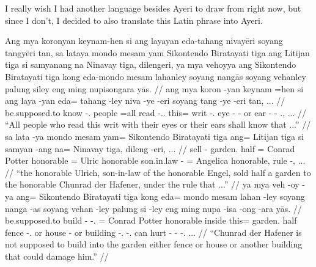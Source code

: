 \documentclass[12pt,paper=a4]{scrartcl}
\begin{document}
	I really wish I had another language besides Ayeri to draw from right 
	now, but since I don't, I decided to also translate this Latin phrase 
	into Ayeri.


\pex
	\glpreamble Ang mya koronyan keynam-hen si ang layayan eda-tahang 
		nivayēri soyang tangyēri tan, sa lataya mondo mesam yam 
		Sikontendo Biratayati tiga ang Litijan tiga si samyanang na 
		Ninavay tiga, dilengeri, ya mya vehoyya ang Sikontendo 
		Biratayati tiga kong eda-mondo mesam lahanley soyang nangās 
		soyang vehanley palung siley eng ming nupisongara yās. //
	\a \begingl
		\gla ang mya koron -yan keynam =hen si ang laya -yan eda= tahang 
			-ley niva -ye -eri soyang tang -ye -eri tan, ... //
		\glb \AgtT{} be.supposed.to know -\Tpl{}.\M{} people =all \Rel{} 
			\AgtT{} read -\Tpl{}.\M{}.\Top{} this= writ 
			-\Parg{}.\Inan{} eye -\Pl{} -\Ins{} or ear -\Pl{} 
			-\Ins{} \Tpl{}.\Gen{}, ... //
		\glft \enquote{All people who read this writ with their eyes or 
			their ears shall know that ...} //
	\endgl
	\a \begingl
		\gla sa lata -ya mondo mesam yam= Sikontendo Biratayati tiga 
			ang= Litijan tiga si samyan -ang na= Ninavay tiga, 
			dileng -eri, ... //
		\glb \PatT{} sell -\Tsg{} garden.\Top{} half \Dat{}= Conrad 
			Potter honorable \Aarg{}= Ulric honorable \Rel{} 
			son.in.law -\Aarg{} \Gen{}= Angelica honorable, rule 
			-\Ins{}, ... //
		\glft \enquote{the honorable Ulrich, son-in-law of the honorable 
			Engel, sold half a garden to the honorable Chunrad der 
			Hafener, under the rule that ...} //
	\endgl
	\a \begingl
		\gla ya mya veh -oy -ya ang= Sikontendo Biratayati tiga kong 
			eda= mondo mesam lahan -ley soyang nanga -as soyang 
			vehan -ley palung si -ley eng ming nupa -isa -ong -ara 
			yās. //
		\glb \LocT{} be.supposed.to build -\Neg{} -\Tsg{}.\M{} \Aarg{}= 
			Conrad Potter honorable inside this= garden.\Top{} half 
			fence -\Parg{}.\Inan{} or house -\Parg{} or building 
			-\Parg{}.\Inan{} \Rel{} -\Parg{}.\Inan{} can hurt 
			-\Caus{} -\Irr{} -\Tsg{}.\Inan{} \Tsg{}.\M{}.\Parg{}. //
		\glft \enquote{Chunrad der Hafener is not supposed to build into 
		the garden either fence or house or another building that could 
		damage him.} //
	\endgl
\xe
\end{document}
